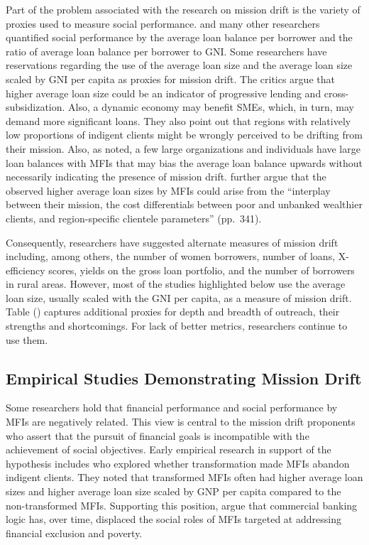 \documentclass[a4paper,nobind]{templates/ociamthesis}
\begin{document}
Part of the problem associated with the research on mission drift is the variety of proxies used to measure social performance. \textcite{mersland2010microfinance} and many other researchers quantified social performance by the average loan balance per borrower and the ratio of average loan balance per borrower to GNI. Some researchers have reservations regarding the use of the average loan size and the average loan size scaled by GNI per capita as proxies for mission drift. The critics argue that higher average loan size could be an indicator of progressive lending and cross-subsidization. Also, a dynamic economy may benefit SMEs, which, in turn, may demand more significant loans. They also point out that regions with relatively low proportions of indigent clients might be wrongly perceived to be drifting from their mission. Also, as noted, a few large organizations and individuals have large loan balances with MFIs that may bias the average loan balance upwards without necessarily indicating the presence of mission drift. \autocite{armendariz2011mission} further argue that the observed higher average loan sizes by MFIs could arise from the ``interplay between their mission, the cost differentials between poor and unbanked wealthier clients, and region-specific clientele parameters'' (pp.~341).

Consequently, researchers have suggested alternate measures of mission drift including, among others, the number of women borrowers, number of loans, X-efficiency scores, yields on the gross loan portfolio, and the number of borrowers in rural areas. However, most of the studies highlighted below use the average loan size, usually scaled with the GNI per capita, as a measure of mission drift. Table () captures additional proxies for depth and breadth of outreach, their strengths and shortcomings. For lack of better metrics, researchers continue to use them.

\hypertarget{empirical-studies-demonstrating-mission-drift}{%
\subsection{Empirical Studies Demonstrating Mission Drift}\label{empirical-studies-demonstrating-mission-drift}}

\noindent Some researchers hold that financial performance and social performance by MFIs are negatively related. This view is central to the mission drift proponents who assert that the pursuit of financial goals is incompatible with the achievement of social objectives. Early empirical research in support of the hypothesis includes \textcite{christen2001commercialization} who explored whether transformation made MFIs abandon indigent clients. They noted that transformed MFIs often had higher average loan sizes and higher average loan size scaled by GNP per capita compared to the non-transformed MFIs. Supporting this position, \textcite{kent2013bankers} argue that commercial banking logic has, over time, displaced the social roles of MFIs targeted at addressing financial exclusion and poverty.
\end{document}
